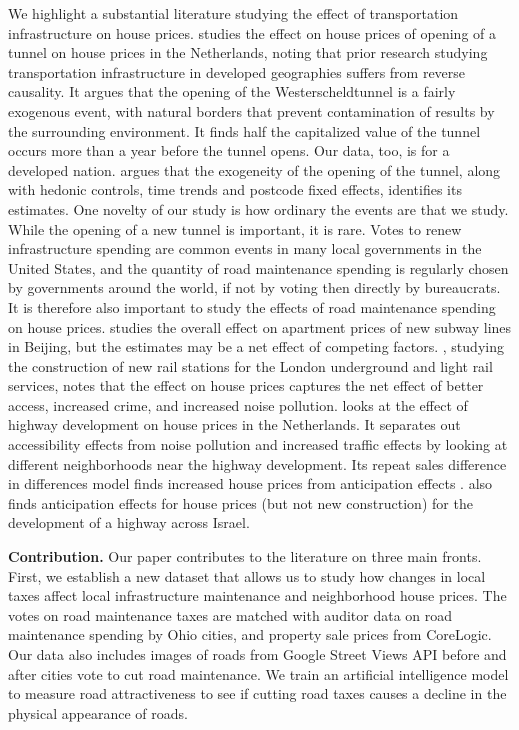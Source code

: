 We highlight a substantial literature studying the effect of transportation infrastructure on house prices. \cite{hoogendoorn2019house} studies the effect on house prices of opening of a tunnel on house prices in the Netherlands, noting that prior research studying transportation infrastructure in developed geographies suffers from reverse causality.  It argues that the opening of the Westerscheldtunnel is a fairly exogenous event, with natural borders that prevent contamination of results by the surrounding environment.  It finds half the capitalized value of the tunnel occurs more than a year before the tunnel opens.  Our data, too, is for a developed nation. \cite{hoogendoorn2019house} argues that the exogeneity of the opening of the tunnel, along with hedonic controls, time trends and postcode fixed effects, identifies its estimates.  One novelty of our study is how ordinary the events are that we study.  While the opening of a new tunnel is important, it is rare.  Votes to renew infrastructure spending are common events in many local governments in the United States, and the quantity of road maintenance spending is regularly chosen by governments around the world, if not by voting then directly by bureaucrats.  It is therefore also important to study the effects of road maintenance spending on house prices. \cite{li2016wheels} studies the overall effect on apartment prices of new subway lines in Beijing, but the estimates may be a net effect of competing factors. \cite{gibbons2005valuing}, studying the construction of new rail stations for the London underground and light rail services, notes that the effect on house prices captures the net effect of better access, increased crime, and increased noise pollution. \cite{levkovich2016effects} looks at the effect of highway development on house prices in the Netherlands.  It separates out accessibility effects from noise pollution and increased traffic effects by looking at different neighborhoods near the highway development.  Its repeat sales difference in differences model finds increased house prices from anticipation effects \citep{kohlhase1991impact}. \cite{beenstock2016hedonic} also finds anticipation effects for house prices (but not new construction) for the development of a highway across Israel. 

{\bf Contribution.} Our paper contributes to the literature on three main fronts. First, we establish a new dataset that allows us to study how changes in local taxes affect local infrastructure maintenance and neighborhood house prices.  The votes on road maintenance taxes are matched with auditor data on road maintenance spending by Ohio cities, and property sale prices from CoreLogic. Our data also includes images of roads from Google Street Views API before and after cities vote to cut road maintenance. We train an artificial intelligence model to measure road attractiveness to see if cutting road taxes causes a decline in the physical appearance of roads.  

